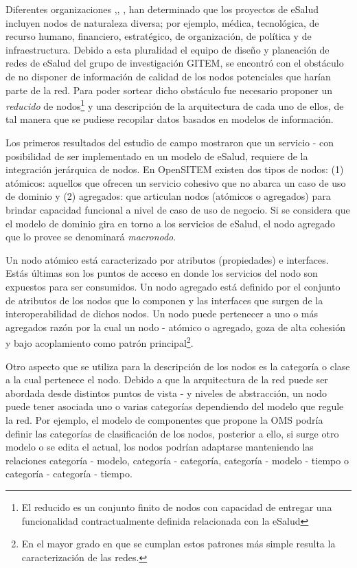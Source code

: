 Diferentes organizaciones \cite{ops2011},\cite{oms2016}, \cite{ituoms2012}, han determinado que los proyectos de eSalud incluyen nodos de naturaleza diversa; por ejemplo, médica, tecnológica, de recurso humano, financiero, estratégico, de organización, de política y de infraestructura. Debido a esta pluralidad el equipo de diseño y planeación de redes de eSalud del grupo de investigación GITEM, se encontró con el obstáculo de no disponer de información de calidad de los nodos potenciales que harían parte de la red. Para poder sortear dicho obstáculo fue necesario proponer un \textit{reducido} de nodos\footnote{El reducido es un conjunto finito de nodos con capacidad de entregar una funcionalidad contractualmente definida relacionada con la eSalud} y una descripción de la arquitectura de cada uno de ellos, de tal manera que se pudiese recopilar datos basados en modelos de información.

Los primeros resultados del estudio de campo mostraron que un servicio - con posibilidad de ser implementado en un modelo de eSalud, requiere de la integración jerárquica de nodos. En OpenSITEM existen dos tipos de nodos: (1) atómicos: aquellos que ofrecen un servicio cohesivo que no abarca un caso de uso de dominio  y (2) agregados: que articulan nodos (atómicos o agregados) para brindar capacidad funcional a nivel de caso de uso de negocio. Si se considera que el modelo de dominio gira en torno a los servicios de eSalud, el nodo agregado que lo provee se denominará \textit{macronodo}.

Un nodo atómico está caracterizado por atributos (propiedades) e interfaces. Estás últimas son los puntos de acceso en donde los servicios del nodo son expuestos para ser consumidos\cite{theopengroup2016}. Un nodo agregado está definido por el conjunto de atributos de los nodos que lo componen y las interfaces que surgen de la interoperabilidad de dichos nodos. Un nodo puede pertenecer a uno o más agregados razón por la cual un nodo - atómico o agregado, goza de alta cohesión y bajo acoplamiento como patrón principal\footnote{En el mayor grado en que se cumplan estos patrones más simple resulta la caracterización de las redes.}.

Otro aspecto que se utiliza para la descripción de los nodos es la categoría o clase a la cual pertenece el nodo. Debido a que la arquitectura de la red puede ser abordada desde distintos puntos de vista - y niveles de abstracción, un nodo puede tener asociada uno o varias categorías dependiendo del modelo que regule la red. Por ejemplo, el modelo de componentes que propone la OMS podría definir las categorías de clasificación de los nodos, posterior a ello, si surge otro modelo o se edita el actual, los nodos podrían adaptarse manteniendo las relaciones categoría - modelo,  categoría - categoría, categoría - modelo - tiempo o categoría - categoría - tiempo.

